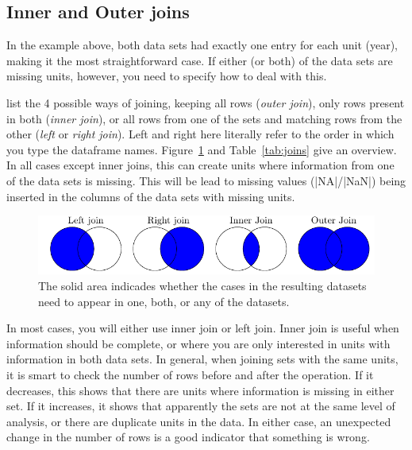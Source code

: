 


\subsection{Inner and Outer joins}

In the example above, both data sets had exactly one entry for each unit (year), making it the most straightforward case.
If either (or both) of the data sets are missing units, however, you need to specify how to deal with this.

 list the 4 possible ways of joining, keeping all rows (\emph{outer join}), only rows present in both (\emph{inner join}), or all rows from one of the sets and matching rows from the other (\emph{left} or \emph{right join}). Left and right here literally refer to the order in which you type the dataframe names. Figure~\ref{fig:joinvenn} and Table~\ref{tab:joins} give an overview. 
In all cases except inner joins, this can create units where information from one of the data sets is missing.
This will be lead to missing values (|NA|/|NaN|) being inserted in the columns of the data sets with missing units.

%
\begin{figure}
    \centering
    \includegraphics{figures/ch07_figjoins}
    \caption{The solid area indicades whether the cases in the resulting datasets need to appear in one, both, or any of the datasets.}
    \label{fig:joinvenn}
\end{figure}



In most cases, you will either use inner join or left join.
Inner join is useful when information should be complete,
or where you are only interested in units with information in both data sets.
In general, when joining sets with the same units, it is smart to check the number of rows before and after the operation.
If it decreases, this shows that there are units where information is missing in either set.
If it increases, it shows that apparently the sets are not at the same level of analysis,
or there are duplicate units in the data.
In either case, an unexpected change in the number of rows is a good indicator that something is wrong.

